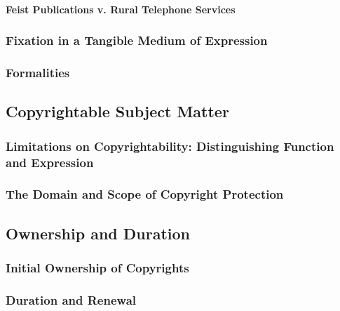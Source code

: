 
\paragraph{Feist Publications v. Rural Telephone Services}


\subsubsection{Fixation in a Tangible Medium of Expression}


\subsubsection{Formalities}


\subsection{Copyrightable Subject Matter}


\subsubsection{Limitations on Copyrightability: Distinguishing Function and 
Expression}


\subsubsection{The Domain and Scope of Copyright Protection}


\subsection{Ownership and Duration}


\subsubsection{Initial Ownership of Copyrights}


\subsubsection{Duration and Renewal}

